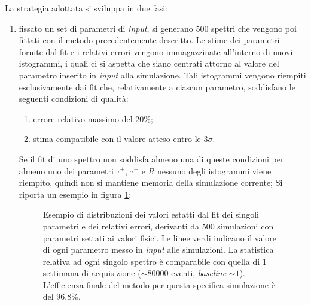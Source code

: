 \documentclass[10pt, oneside, a4paper]{article}   	%
\begin{document}
La strategia adottata si sviluppa in due fasi:
\begin{enumerate}
 \item fissato un set di parametri di \textit{input}, si generano 500 spettri che vengono poi fittati con il metodo precedentemente descritto. Le stime dei parametri fornite dal fit e i relativi errori vengono immagazzinate all'interno di nuovi istogrammi, i quali ci si aspetta che siano centrati attorno al valore del parametro inserito in \textit{input} alla simulazione. Tali istogrammi vengono riempiti esclusivamente dai fit che, relativamente a ciascun parametro, soddisfano le seguenti condizioni di qualità:
 \begin{enumerate}
  \item errore relativo massimo del $20\%$;
  \item stima compatibile con il valore atteso entro le $3\sigma$. 
 \end{enumerate}
 Se il fit di uno spettro non soddisfa almeno una di queste condizioni per almeno uno dei parametri $\tau^+$, $\tau^-$ e $R$ nessuno degli istogrammi viene riempito, quindi non si mantiene memoria della simulazione corrente;
 Si riporta un esempio in figura \ref{fig::esempio_set_simulazioni};
 \begin{figure}
  \centering
  \begin{adjustbox}{width=\linewidth}
  
  \end{adjustbox}
  \caption{Esempio di distribuzioni dei valori estatti dal fit dei singoli parametri e dei relativi errori, derivanti da 500 simulazioni con parametri settati ai valori fisici. Le linee verdi indicano il valore di ogni parametro messo in \textit{input} alle simulazioni. La statistica relativa ad ogni singolo spettro è comparabile con quella di 1 settimana di acquisizione ($\sim 80000$ eventi, \textit{baseline} $\sim 1$). L'efficienza finale del metodo per questa specifica simulazione è del $96.8\%$.}
  \label{fig::esempio_set_simulazioni}
 \end{figure}
 

\end{enumerate}
\end{document}
